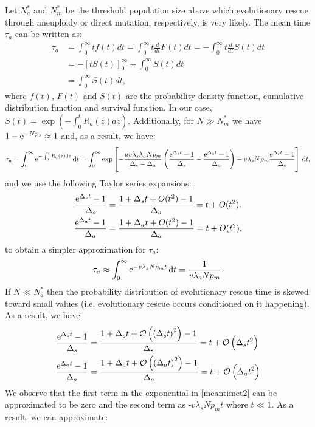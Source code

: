 \documentclass[12pt]{extarticle}
\renewcommand{\d}[1]{\ensuremath{\operatorname{d}\!{#1}}}
\renewcommand{\d}{{\rm d}}
\newcommand{\e}{{\rm e}}
\begin{document}
\begin{appendices}
Let $N_a^*$ and $N_m^*$ be the threshold population size above which evolutionary rescue through aneuploidy or direct mutation, respectively, is very likely. The mean time $\tau_a$ can be written as: %
\begin{align*}
\tau_a&=\int_0^\infty tf(t)dt=\int_0^\infty t\frac{d}{dt}F(t)dt=-\int_0^\infty t\frac{d}{dt}S(t)dt\\
&=-\left[tS(t)\right]_0^\infty+\int_0^\infty S(t)dt\\
&=\int_0^\infty S(t)dt,
\end{align*}
where $f(t)$, $F(t)$ and $S(t)$ are the probability density function, cumulative distribution function and survival function.
In our case, $S(t)=\exp\left(-\int_0^t R_a(z)dz\right)$.
Additionally, for $N\gg N_m^*$ we have $1-\e^{-Np_s}\approx1$ and, as a result, we have: %
\begin{align*}
\tau_a=\int_0^\infty\e^{-\int_0^t R_a\left(z\right)\d z}\,\d t=\int_0^\infty\exp\left[-\frac{uv\lambda_s\lambda_aNp_m}{\Delta_s-\Delta_a}\left(\frac{\e^{\Delta_s t}-1}{\Delta_s}-\frac{\e^{\Delta_a t}-1}{\Delta_a}\right)-v\lambda_sNp_m\frac{\e^{\Delta_s t}-1}{\Delta_s}\right]\,\d t,
\end{align*} %
and we use the following Taylor series expansions:
\begin{align*}
\frac{\e^{\Delta_s t}-1}{\Delta_s}&=\frac{1+\Delta_s t+O(t^2)-1}{\Delta_s}=t+O(t^2).\\ %
\frac{\e^{\Delta_a t}-1}{\Delta_a}&=\frac{1+\Delta_a t+O(t^2)-1}{\Delta_a}=t+O(t^2), %
\end{align*}
to obtain a simpler approximation for $\tau_a$:
\begin{align}\label{limitapprox3}
\tau_a\approx\int_0^\infty\e^{-v\lambda_sNp_m t}\,\d t=\frac{1}{v\lambda_sNp_m}. %
\end{align}
If $N\ll N_a^*$ then the probability distribution of evolutionary rescue time is skewed toward small values (i.e. evolutionary rescue occurs conditioned on it happening). As a result, we have: 
\begin{align*}
\frac{\e^{\Delta_s t}-1}{\Delta_s}&=\frac{1+\Delta_s t+\mathcal{O}\left(\left(\Delta_st\right)^2\right)-1}{\Delta_s}=t+\mathcal{O}\left(\Delta_st^2\right)\\
\frac{\e^{\Delta_a t}-1}{\Delta_a}&=\frac{1+\Delta_a t+\mathcal{O}\left(\left(\Delta_at\right)^2\right)-1}{\Delta_a}=t+\mathcal{O}\left(\Delta_at^2\right)
\end{align*}
We observe that the first term in the exponential in \cref{meantimet2} can be approximated to be zero and the second term as -$v\lambda_sNp_mt$ where $t\ll1$. As a result, we can approximate:

\end{appendices}
\end{document}
